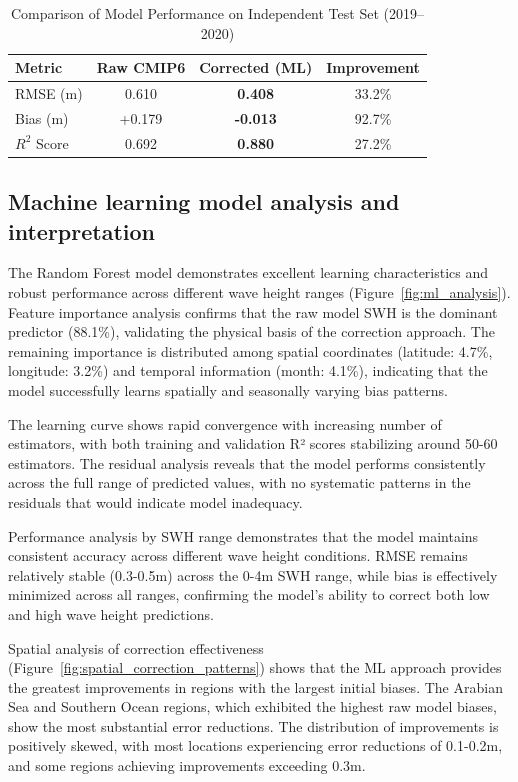 \documentclass[twocolumn]{article}
\begin{document}
 \begin{table}[H]
 \centering
 \caption{Comparison of Model Performance on Independent Test Set (2019--2020)}
 \label{tab:results}
 \begin{tabular}{@{}lccc@{}}
 \toprule
 Metric & Raw CMIP6 & Corrected (ML) & Improvement \\ \midrule
 RMSE (m) & 0.610 & \textbf{0.408} & 33.2\% \\
 Bias (m) & +0.179 & \textbf{-0.013} & 92.7\% \\
 $R^2$ Score & 0.692 & \textbf{0.880} & 27.2\% \\ \bottomrule
 \end{tabular}
 \end{table}
 
 \subsection{Machine learning model analysis and interpretation}
 
 The Random Forest model demonstrates excellent learning characteristics and robust performance across different wave height ranges (Figure~\ref{fig:ml_analysis}). Feature importance analysis confirms that the raw model SWH is the dominant predictor (88.1\%), validating the physical basis of the correction approach. The remaining importance is distributed among spatial coordinates (latitude: 4.7\%, longitude: 3.2\%) and temporal information (month: 4.1\%), indicating that the model successfully learns spatially and seasonally varying bias patterns.
 
 The learning curve shows rapid convergence with increasing number of estimators, with both training and validation R² scores stabilizing around 50-60 estimators. The residual analysis reveals that the model performs consistently across the full range of predicted values, with no systematic patterns in the residuals that would indicate model inadequacy.
 
 Performance analysis by SWH range demonstrates that the model maintains consistent accuracy across different wave height conditions. RMSE remains relatively stable (0.3-0.5m) across the 0-4m SWH range, while bias is effectively minimized across all ranges, confirming the model's ability to correct both low and high wave height predictions.
 
 Spatial analysis of correction effectiveness (Figure~\ref{fig:spatial_correction_patterns}) shows that the ML approach provides the greatest improvements in regions with the largest initial biases. The Arabian Sea and Southern Ocean regions, which exhibited the highest raw model biases, show the most substantial error reductions. The distribution of improvements is positively skewed, with most locations experiencing error reductions of 0.1-0.2m, and some regions achieving improvements exceeding 0.3m.
\end{document}
